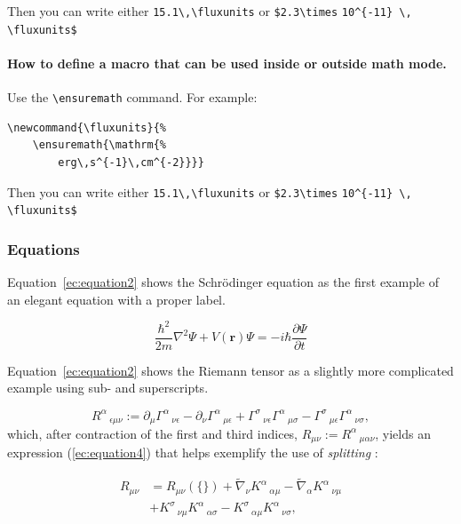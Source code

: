 \documentclass[9pt,article,twoside]{rmaa-rho-class/rmaa-rho}
\newcommand{\CS}[1]{\texttt{\textbackslash #1}}
\begin{document}
        Then you can write either \verb+15.1\,\fluxunits+ or \verb+$2.3\times+ \verb+10^{-11} \,+ \verb+\fluxunits$+
    
        \paragraph{How to define a macro that can be used inside or outside math mode.} Use the \CS{ensuremath} command. For example: 
        
\begin{verbatim}
\newcommand{\fluxunits}{%
    \ensuremath{\mathrm{%
        erg\,s^{-1}\,cm^{-2}}}}
\end{verbatim}
    
        Then you can write either \verb+15.1\,\fluxunits+ or \verb+$2.3\times+ \verb+10^{-11} \,+ \verb+\fluxunits$+

    \subsubsection{Equations}

        Equation~\ref{ec:equation2} shows the Schrödinger equation as the first example of an elegant equation with a proper label.

    \begin{equation} \label{ec:equation2}
         \frac{\hbar^2}{2m}\nabla^2\Psi + V(\mathbf{r})\Psi = -i\hbar \frac{\partial\Psi}{\partial t}
    \end{equation} 

    Equation~\ref{ec:equation2} shows the Riemann tensor as a slightly more complicated example using sub- and superscripts.

    \begin{equation} \label{ec:equation3}
        R^\alpha\,_{\epsilon\mu\nu}:=\partial_\mu\Gamma^\alpha\,_{\nu\epsilon}
	-\partial_\nu\Gamma^\alpha\,_{\mu\epsilon}
	+\Gamma^\sigma\,_{\nu\epsilon} \Gamma^\alpha\,_{\mu\sigma}
	-\Gamma^\sigma\,_{\mu\epsilon} \Gamma^\alpha\,_{\nu\sigma},
    \end{equation}
    which, after contraction of the first and third indices, $R_{\mu\nu}:=R^\alpha\,_{\mu\alpha\nu}$, yields an expression (\ref{ec:equation4}) that helps exemplify the use of \textit{splitting} \citep{BarMen17}:

    \begin{equation} \label{ec:equation4}
	\begin{split}
    	R_{\mu\nu}&=R_{\mu\nu}(\{\})
    	+\tilde{\nabla}_\nu K^\alpha\,_{\alpha\mu}
    	-\tilde{\nabla}_\alpha K^\alpha\,_{\nu\mu}\\
    	&+K^\sigma\,_{\nu\mu} K^\alpha\,_{\alpha\sigma}
    	-K^\sigma\,_{\alpha\mu} K^\alpha\,_{\nu\sigma},
	\end{split}
    \end{equation}
\end{document}

